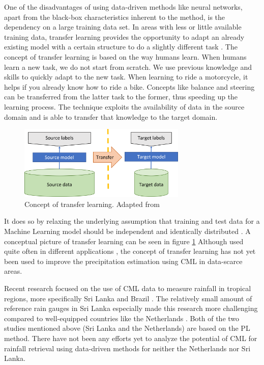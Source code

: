 \documentclass[twocolumn, 10pt, a4paper]{article}
\begin{document}
	One of the disadvantages of using data-driven methods like neural networks, apart from the black-box characteristics inherent to the method, is the dependency on a large training data set. In areas with less or little available training data, transfer learning provides the opportunity to adapt an already existing model with a certain structure to do a slightly different task \cite{TanYear}. The concept of transfer learning is based on the way humans learn. When humans learn a new task, we do not start from scratch. We use previous knowledge and skills to quickly adapt to the new task. When learning to ride a motorcycle, it helps if you already know how to ride a bike. Concepts like balance and steering can be transferred from the latter task to the former, thus speeding up the learning process. 
	The technique exploits the availability of data in the source domain and is able to transfer that knowledge to the target domain.
	\begin{figure}[t]
		\includegraphics[width=8cm]{Transfer_learning_concept}
		\caption{Concept of transfer learning. Adapted from \protect\cite{Sarkar2018} }
		\label{fig:transferconcept}
	\end{figure} 
	It does so by relaxing the underlying assumption that training and test data for a Machine Learning model should be independent and identically distributed \cite{Weiss2016}. A conceptual picture of transfer learning can be seen in figure \ref{fig:transferconcept} Although used quite often in different applications \cite{Zhuang2021}, the concept of transfer learning has not yet been used to improve the precipitation estimation using CML in data-scarce areas. 
		
	Recent research focused on the use of CML data to measure rainfall in tropical regions, more specifically Sri Lanka \cite{Overeem2021} and Brazil \cite{RiosGaona2017a}. The relatively small amount of reference rain gauges in Sri Lanka especially made this research more challenging compared to well-equipped countries like the Netherlands \cite{Overeem2013}. Both of the two studies mentioned above (Sri Lanka and the Netherlands) are based on the PL method. There have not been any efforts yet to analyze the potential of CML for rainfall retrieval using data-driven methods for neither the Netherlands nor Sri Lanka. 
\end{document}
